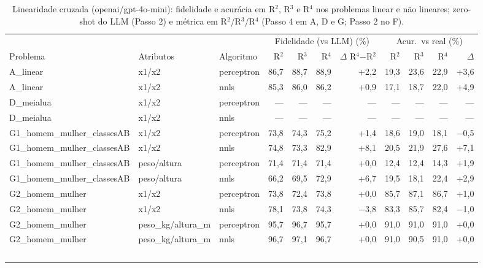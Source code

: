 \begin{table}[htbp]
\centering
\footnotesize
\caption{Linearidade cruzada (openai/gpt-4o-mini): fidelidade e acurácia em R$^2$, R$^3$ e R$^4$ nos problemas linear e não lineares; zero-shot do LLM (Passo 2) e métrica em R$^2$/R$^3$/R$^4$ (Passo 4 em A, D e G; Passo 2 no F).}
\label{tab:final_linearidade_cruzada_R2_R3_R4_gpt4mini}
\begin{tabular}{lllrrrrrrrr}
\toprule
 &  &  & \multicolumn{4}{c}{Fidelidade (vs LLM) (\%)} & \multicolumn{4}{c}{Acur.\ vs real (\%)} \\ \cmidrule(lr){4-7} \cmidrule(lr){8-11}
Problema & Atributos & Algoritmo & R$^2$ & R$^3$ & R$^4$ & $\Delta$ R$^4$$-$R$^2$ & R$^2$ & R$^3$ & R$^4$ & $\Delta$ \\
\midrule
A\_linear & x1/x2 & perceptron & 86,7 & 88,7 & 88,9 & +2,2 & 19,3 & 23,6 & 22,9 & +3,6 \\
A\_linear & x1/x2 & nnls & 85,3 & 86,0 & 86,2 & +0,9 & 17,1 & 18,7 & 22,0 & +4,9 \\
\midrule
D\_meialua & x1/x2 & perceptron & — & — & — & — & — & — & — & — \\
D\_meialua & x1/x2 & nnls & — & — & — & — & — & — & — & — \\
\midrule
G1\_homem\_mulher\_classesAB & x1/x2 & perceptron & 73,8 & 74,3 & 75,2 & +1,4 & 18,6 & 19,0 & 18,1 & $-$0,5 \\
G1\_homem\_mulher\_classesAB & x1/x2 & nnls & 74,8 & 73,3 & 82,9 & +8,1 & 20,5 & 21,9 & 27,6 & +7,1 \\
G1\_homem\_mulher\_classesAB & peso/altura & perceptron & 71,4 & 71,4 & 71,4 & +0,0 & 12,4 & 12,4 & 14,3 & +1,9 \\
G1\_homem\_mulher\_classesAB & peso/altura & nnls & 66,2 & 69,5 & 72,9 & +6,7 & 19,5 & 18,1 & 22,4 & +2,9 \\
\midrule
G2\_homem\_mulher & x1/x2 & perceptron & 73,8 & 72,4 & 73,8 & +0,0 & 85,7 & 87,1 & 86,7 & +1,0 \\
G2\_homem\_mulher & x1/x2 & nnls & 78,1 & 73,8 & 74,3 & $-$3,8 & 83,3 & 85,7 & 82,4 & $-$1,0 \\
G2\_homem\_mulher & peso\_kg/altura\_m & perceptron & 95,7 & 96,7 & 95,7 & +0,0 & 91,0 & 91,0 & 91,0 & +0,0 \\
G2\_homem\_mulher & peso\_kg/altura\_m & nnls & 96,7 & 97,1 & 96,7 & +0,0 & 91,0 & 90,5 & 91,0 & +0,0 \\
\bottomrule
$$
\end{tabular}
\end{table}
